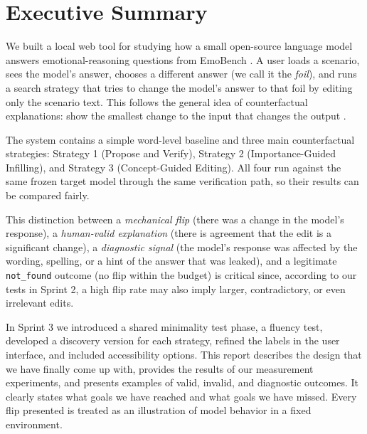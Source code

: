 \documentclass[11pt,a4paper]{article}
\newcommand{\stratone}{Strategy 1 (Propose and Verify)}
\newcommand{\strattwo}{Strategy 2 (Importance-Guided Infilling)}
\newcommand{\stratthree}{Strategy 3 (Concept-Guided Editing)}
\begin{document}
\tableofcontents
\newpage
{}

\section*{Executive Summary}

We built a local web tool for studying how a small open-source language model answers
emotional-reasoning questions from EmoBench \cite{sabour2024}. A user loads a scenario,
sees the model's answer, chooses a different answer (we call it the \emph{foil}), and
runs a search strategy that tries to change the model's answer to that foil by editing
only the scenario text. This follows the general idea of counterfactual explanations:
show the smallest change to the input that changes the output
\cite{wachter2018,miller2019}.

The system contains a simple word-level baseline and three main counterfactual
strategies: \stratone{}, \strattwo{}, and \stratthree{}. All four run against the same
frozen target model through the same verification path, so their results can be
compared fairly.

This distinction between a \emph{mechanical flip} (there was a change in the model's
response), a \emph{human-valid explanation} (there is agreement that the edit is a
significant change), a \emph{diagnostic signal} (the model's response was affected by
the wording, spelling, or a hint of the answer that was leaked), and a legitimate
\texttt{not\_found} outcome (no flip within the budget) is critical since, according
to our tests in Sprint 2, a high flip rate may also imply larger, contradictory, or
even irrelevant edits.

In Sprint 3 we introduced a shared minimality test phase, a fluency test, developed a
discovery version for each strategy, refined the labels in the user interface, and
included accessibility options. This report describes the design that we have finally
come up with, provides the results of our measurement experiments, and presents
examples of valid, invalid, and diagnostic outcomes. It clearly states what goals we
have reached and what goals we have missed. Every flip presented is treated as an
illustration of model behavior in a fixed environment.
\end{document}
